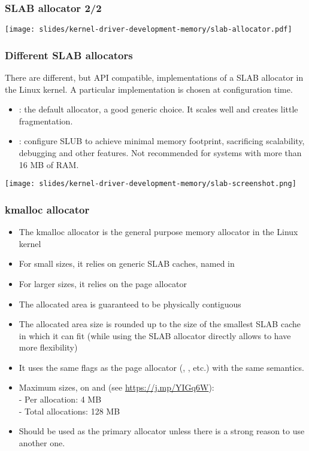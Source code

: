 \begin{frame}
  \frametitle{SLAB allocator 2/2}
  \begin{center}
    \texttt{[image: slides/kernel-driver-development-memory/slab-allocator.pdf]}
  \end{center}
\end{frame}

\begin{frame}[fragile]
  \frametitle{Different SLAB allocators}
  \small
  There are different, but API compatible, implementations of
  a SLAB allocator in the Linux kernel. A particular implementation
  is chosen at configuration time.
  \begin{itemize}
  \item {}: the default allocator, a good generic
    choice. It scales well and creates little fragmentation.
  \item {}: configure SLUB to achieve minimal memory
	footprint, sacrificing scalability, debugging and other
        features. Not recommended for systems with more than 16 MB of RAM.
  \end{itemize}
  \begin{center}
    \texttt{[image: slides/kernel-driver-development-memory/slab-screenshot.png]}
  \end{center}
\end{frame}

\begin{frame}
  \frametitle{kmalloc allocator}
  \begin{itemize}
  \item The kmalloc allocator is the general purpose memory allocator
    in the Linux kernel
  \item For small sizes, it relies on generic SLAB caches, named
     in 
  \item For larger sizes, it relies on the page allocator
  \item The allocated area is guaranteed to be physically contiguous
  \item The allocated area size is rounded up to the size of the
        smallest SLAB cache in which it can fit
        (while using the SLAB allocator directly allows to have more
        flexibility)
  \item It uses the same flags as the page allocator (,
    , etc.) with the same semantics.
  \item Maximum sizes, on  and  (see
    \url{https://j.mp/YIGq6W}): \\
    - Per allocation: 4 MB \\
    - Total allocations: 128 MB
  \item Should be used as the primary allocator unless there is a
    strong reason to use another one.
  \end{itemize}
\end{frame}

